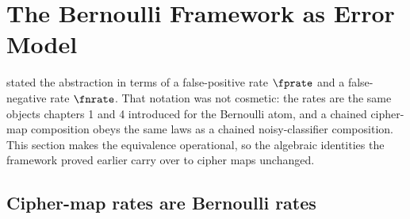 %

\section{The Bernoulli Framework as Error Model}
\label{sec:bernoulli-error-model}

 stated the abstraction in terms of a
false-positive rate $\fprate$ and a false-negative rate $\fnrate$. That
notation was not cosmetic: the rates are the same objects chapters 1 and
4 introduced for the Bernoulli atom, and a chained cipher-map composition
obeys the same laws as a chained noisy-classifier composition. This
section makes the equivalence operational, so the algebraic identities
the framework proved earlier carry over to cipher maps unchanged.

\subsection*{Cipher-map rates are Bernoulli rates}

